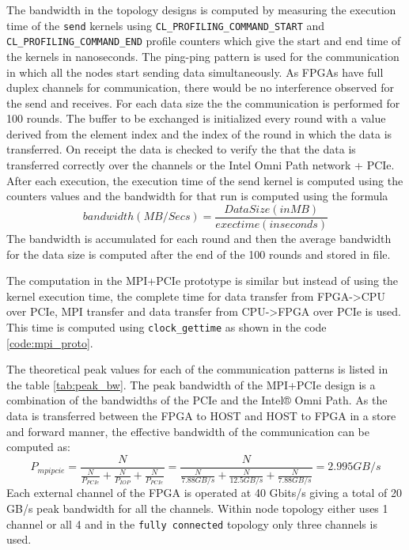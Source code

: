 The bandwidth in the topology designs is computed by measuring the execution time
of the \texttt{send} kernels using \texttt{CL\_PROFILING\_COMMAND\_START}
and \texttt{CL\_PROFILING\_COMMAND\_END} profile counters which give the start and
end time of the kernels in nanoseconds. The ping-ping pattern is used for the
communication in which all the nodes start sending data simultaneously.
As FPGAs have full duplex channels for communication, there would be no interference
observed for the send and receives. For each data size the the communication is performed
for 100 rounds. The buffer to be exchanged is initialized every round with a value derived from the
element index and the index of the round in which the data is transferred. On receipt
the data is checked to verify the that the data is transferred correctly over the channels
or the Intel Omni Path network + PCIe. After each execution, the execution time of the send kernel
is computed using the counters values and the bandwidth for that run is computed using the formula
$$ bandwidth (MB/Secs) = \frac{Data Size (in MB)}{exectime (in seconds)} $$
The bandwidth is accumulated for each round and then the average bandwidth for the
data size is computed after the end of the 100 rounds and stored in file.

The computation in the MPI+PCIe prototype is similar but instead of using the kernel execution
time, the complete time for data transfer from FPGA->CPU over PCIe, MPI transfer and data transfer from
CPU->FPGA over PCIe is used. This time is computed using \texttt{clock\_gettime} as shown in the code
\ref{code:mpi_proto}.

The theoretical peak values for each of the communication patterns is listed in the table \ref{tab:peak_bw}.
The peak bandwidth of the MPI+PCIe design is a combination of the bandwidths of the PCIe
and the Intel® Omni Path. As the data is transferred between the FPGA to HOST and HOST to FPGA
in a store and forward manner, the effective bandwidth of the communication can be computed as:
\begin{equation}\label{eqn:peakbw_mpipcie}
 P_{mpipcie} = \frac{N}{\frac{N}{P_{PCIe}}+\frac{N}{P_{IOP}}+\frac{N}{P_{PCIe}}}
 = \frac{N}{\frac{N}{7.88 GB/s}+\frac{N}{12.5 GB/s}+\frac{N}{7.88 GB/s}} = 2.995 GB/s
\end{equation}
Each external channel of the FPGA is operated at 40 Gbits/s giving a total of 20 GB/s peak
bandwidth for all the channels. Within node topology either uses 1 channel or all 4 and in the
\texttt{fully connected} topology only three channels is used.

